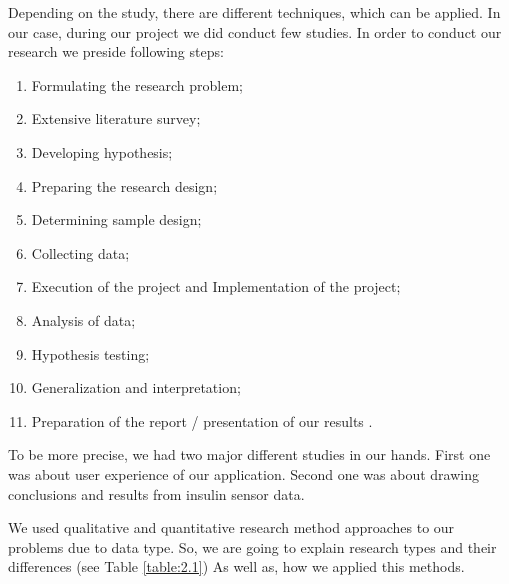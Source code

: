 \par Depending on the study, there are different techniques, which can be applied. In our case, during our project we did conduct few studies. In order to conduct our research we preside following steps: 

\begin{enumerate}
    \item Formulating the research problem;
    \item Extensive literature survey;
    \item Developing hypothesis;
    \item Preparing the research design;
    \item Determining sample design;
    \item Collecting data;
    \item Execution of the project and Implementation of the project;
    \item Analysis of data;
    \item Hypothesis testing;
    \item Generalization and interpretation;
    \item Preparation of the report / presentation of our results \cite{Research-Methodology-Methods-and-Techniques}.
\end{enumerate}

\par To be more precise, we had two major different studies in our hands. First one was about user experience of our application. Second one was about drawing conclusions and results from insulin sensor data. 

\par We used qualitative and quantitative research method approaches to our problems due to data type. So, we are going to explain research types and their differences (see Table \ref{table:2.1}) As well as, how we applied this methods.

